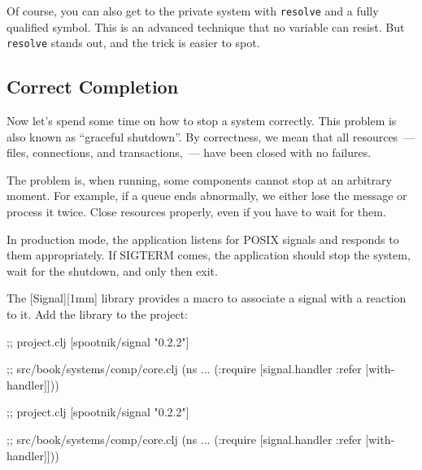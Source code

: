 Of course, you can also get to the private system with \verb|resolve| and a fully qualified symbol. This is an advanced technique that no variable can resist. But \verb|resolve| stands out, and the trick is easier to spot.

\subsection{Correct Completion}


Now let's spend some time on how to stop a system correctly. This problem is also known as ``graceful shutdown''. By correctness, we mean that all resources~--- files, connections, and transactions,~--- have been closed with no failures.

The problem is, when running, some components cannot stop at an arbitrary moment. For example, if a queue ends abnormally, we either lose the message or process it twice. Close resources properly, even if you have to wait for them.


In production mode, the application listens for POSIX signals and responds to them appropriately. If SIGTERM comes, the application should stop the system, wait for the shutdown, and only then exit.


The [Signal][1mm] library provides a macro to associate a signal with a reaction to it. Add the library to the project:

\label{with-handler}

\ifnarrow

\begin{english}
  \begin{clojure}
;; project.clj
[spootnik/signal "0.2.2"]

;; src/book/systems/comp/core.clj
(ns ...
  (:require
   [signal.handler :refer
    [with-handler]]))
  \end{clojure}
\end{english}

\else

\begin{english}
  \begin{clojure}
;; project.clj
[spootnik/signal "0.2.2"]

;; src/book/systems/comp/core.clj
(ns ...
  (:require [signal.handler :refer [with-handler]]))
  \end{clojure}
\end{english}

